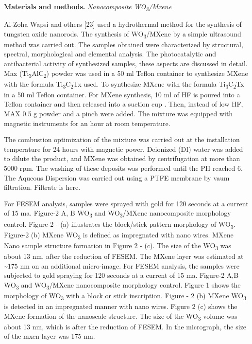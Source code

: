 \begin{multicols}{2}
{\bfseries Materials and methods.} \emph{Nanocomposite
WO\textsubscript{3}/Mxene}

Al-Zoha Wapsi and others {[}23{]} used a hydrothermal method
for the synthesis of tungsten oxide nanorods. The synthesis of
WO\textsubscript{3}/MXene by a simple ultrasound method was
carried out. The samples obtained were characterized by
structural, spectral, morphological and elemental analysis. The
photocatalytic and antibacterial activity of synthesized samples,
these aspects are discussed in detail. Max
(Ti\textsubscript{3}AlC\textsubscript{2}) powder was used in a 50
ml Teflon container to synthesize MXene with the formula
Ti\textsubscript{3}C\textsubscript{2}Tx used. To synthesize MXene
with the formula Ti\textsubscript{3}C\textsubscript{2}Tx in a 50 ml
Teflon container. For MXene synthesis, 10 ml of HF is poured
into a Teflon container and then released into a suction cup .
Then, instead of low HF, MAX 0.5 g powder and a pinch were
added. The mixture was equipped with magnetic instruments for
an hour at room temperature.

The combustion optimization of the mixture was carried out at
the installation temperature for 24 hours with magnetic power.
Deionized (DI) water was added to dilute the product, and MXene
was obtained by centrifugation at more than 5000 rpm. The
washing of these deposits was performed until the PH reached 6.
The Aqueous Dispersion was carried out using a PTFE membrane by
vaum filtration. Filtrate is here.

For FESEM analysis, samples were sprayed with gold for 120
seconds at a current of 15 ma. Figure-2 A, B WO\textsubscript{3}
and WO\textsubscript{3}/MXene nanocomposite morphology control.
Figure-2 - (a) illustrates the block/stick pattern morphology of
WO\textsubscript{3}. Figure-2 (b) MXene WO\textsubscript{3} is
defined as impregnated with nano wires. MXene Nano sample
structure formation in Figure 2 - (c). The size of the
WO\textsubscript{3} was about 13 nm, after the reduction of
FESEM. The MXene layer was estimated at \textasciitilde175 nm on
an additional micro-image. For FESEM analysis, the samples were
subjected to gold spraying for 120 seconds at a current of 15
ma. Figure-2 A,B WO\textsubscript{3} and WO\textsubscript{3}/MXene
nanocomposite morphology control. Figure 1 shows the morphology
of WO\textsubscript{3} with a block or stick inscription. Figure -
2 (b) MXene WO\textsubscript{3} is detected in an impregnated
manner with nano wires. Figure 2 (c) shows the MXene formation
of the nanoscale structure. The size of the WO\textsubscript{3}
volume was about 13 nm, which is after the reduction of FESEM.
In the micrograph, the size of the mxen layer was 175 nm.


\end{multicols}
